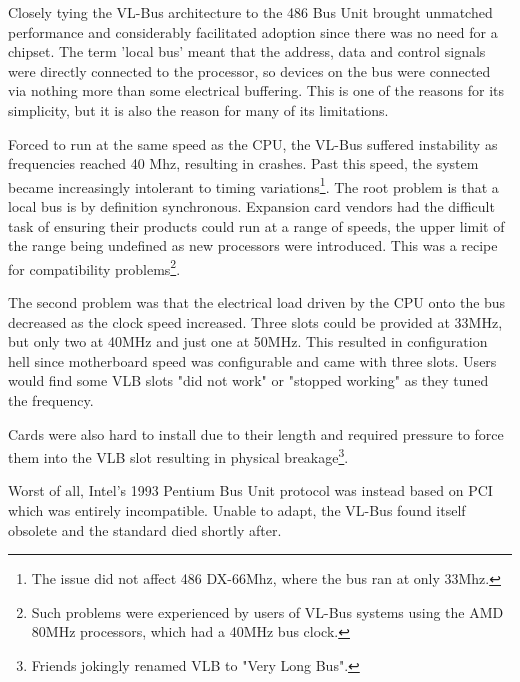 \par
Closely tying the VL-Bus architecture to the 486 Bus Unit brought unmatched performance and considerably facilitated adoption since there was no need for a chipset. The term 'local bus' meant that the address, data and control signals were directly connected to the processor, so devices on the bus were connected via nothing more than some electrical buffering. This is one of the reasons for its simplicity, but it is also the reason for many of its limitations.\\
\par
Forced to run at the same speed as the CPU, the VL-Bus suffered instability as frequencies reached 40 Mhz, resulting in crashes. Past this speed, the system became increasingly intolerant to timing variations\footnote{The issue did not affect 486 DX-66Mhz, where the bus ran at only 33Mhz.}. The root problem is that a local bus is by definition synchronous. Expansion card vendors had the difficult task of ensuring their products could run at a range of speeds, the upper limit of the range being undefined as new processors were introduced. This was a recipe for compatibility problems\footnote{Such problems were experienced by users of VL-Bus systems using the AMD 80MHz processors, which had a 40MHz bus clock.}.\\
\par
The second problem was that the electrical load driven by the CPU onto the bus decreased as the clock speed increased. Three slots could be provided at 33MHz, but only two at 40MHz and just one at 50MHz. This resulted in configuration hell since motherboard speed was configurable and came with three slots. Users would find some VLB slots "did not work" or "stopped working" as they tuned the frequency.\\
\par
Cards were also hard to install due to their length and required pressure to force them into the VLB slot resulting in physical breakage\footnote{Friends jokingly renamed VLB to "Very Long Bus".}.\\
\par
  Worst of all, Intel's 1993 Pentium Bus Unit protocol was instead based on PCI which was entirely incompatible. Unable to adapt, the VL-Bus found itself obsolete and the standard died shortly after.\\
\par

